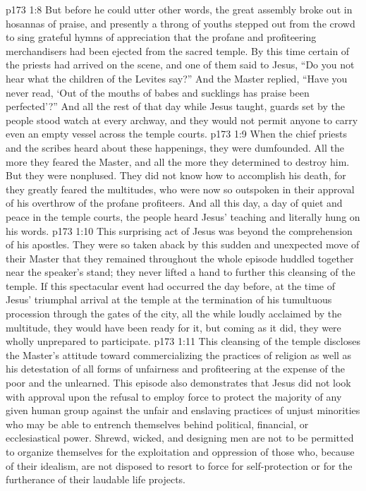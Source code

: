 \vs p173 1:8 But before he could utter other words, the great assembly broke out in hosannas of praise, and presently a throng of youths stepped out from the crowd to sing grateful hymns of appreciation that the profane and profiteering merchandisers had been ejected from the sacred temple. By this time certain of the priests had arrived on the scene, and one of them said to Jesus, “Do you not hear what the children of the Levites say?” And the Master replied, \textcolor{ubdarkred}{“Have you never read, ‘Out of the mouths of babes and sucklings has praise been perfected’?”} And all the rest of that day while Jesus taught, guards set by the people stood watch at every archway, and they would not permit anyone to carry even an empty vessel across the temple courts.
\vs p173 1:9 \pc When the chief priests and the scribes heard about these happenings, they were dumfounded. All the more they feared the Master, and all the more they determined to destroy him. But they were nonplused. They did not know how to accomplish his death, for they greatly feared the multitudes, who were now so outspoken in their approval of his overthrow of the profane profiteers. And all this day, a day of quiet and peace in the temple courts, the people heard Jesus’ teaching and literally hung on his words.
\vs p173 1:10 This surprising act of Jesus was beyond the comprehension of his apostles. They were so taken aback by this sudden and unexpected move of their Master that they remained throughout the whole episode huddled together near the speaker’s stand; they never lifted a hand to further this cleansing of the temple. If this spectacular event had occurred the day before, at the time of Jesus’ triumphal arrival at the temple at the termination of his tumultuous procession through the gates of the city, all the while loudly acclaimed by the multitude, they would have been ready for it, but coming as it did, they were wholly unprepared to participate.
\vs p173 1:11 This cleansing of the temple discloses the Master’s attitude toward commercializing the practices of religion as well as his detestation of all forms of unfairness and profiteering at the expense of the poor and the unlearned. This episode also demonstrates that Jesus did not look with approval upon the refusal to employ force to protect the majority of any given human group against the unfair and enslaving practices of unjust minorities who may be able to entrench themselves behind political, financial, or ecclesiastical power. Shrewd, wicked, and designing men are not to be permitted to organize themselves for the exploitation and oppression of those who, because of their idealism, are not disposed to resort to force for self\hyp{}protection or for the furtherance of their laudable life projects.
